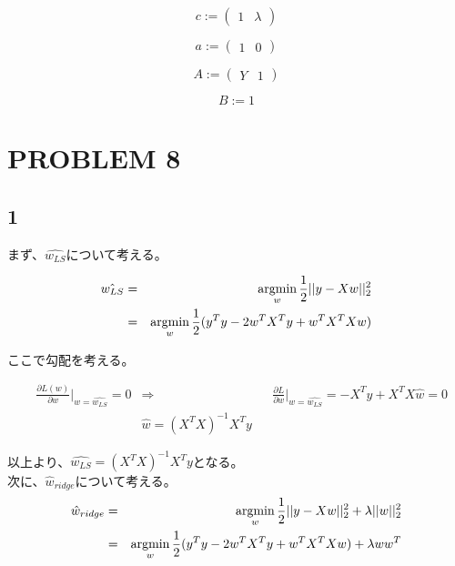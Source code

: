 \documentclass[a4j,11pt]{jarticle}
\newcommand{\argmin}{\mathop{\rm argmin}\limits}
\begin{document}
\begin{equation*}
    c :=
    \begin{pmatrix}
        1 & \lambda
    \end{pmatrix}
\end{equation*}

\begin{equation*}
    a :=
    \begin{pmatrix}
        1 & 0
    \end{pmatrix}
\end{equation*}

\begin{equation*}
    A :=
    \begin{pmatrix}
        Y & 1
    \end{pmatrix}
\end{equation*}

\begin{equation*}
    B := 1
\end{equation*}

\newpage
\section*{PROBLEM 8}
\subsection*{1}
まず、$\hat{w_{LS}}$について考える。

\begin{eqnarray}
    \hat{w_{LS}} &=& \argmin_{w} \frac{1}{2}||y-Xw||^2_2\\
    &=& \argmin_{w} \frac{1}{2}(y^Ty-2w^TX^Ty + w^TX^TXw)
\end{eqnarray}

ここで勾配を考える。

\begin{equation}
    \begin{aligned}
        & \frac{\partial L(w)}{\partial w}|_{w=\hat{w_{LS}}} = 0
        &\Rightarrow
        &&\frac{\partial L}{\partial w}|_{w=\hat{w_{LS}}} = -X^Ty + X^TX\hat{w} = 0\\
        &&\hat{w} = (X^TX)^{-1}X^Ty
    \end{aligned}
\end{equation}

以上より、$\hat{w_{LS}} = (X^TX)^{-1}X^Ty$となる。\\

次に、$\hat{w}_{ridge}$について考える。
\begin{eqnarray}
    \hat{w}_{ridge} &=& \argmin_{w} \frac{1}{2}||y-Xw||^2_2 + \lambda ||w||^2_2\\
    &=& \argmin_{w} \frac{1}{2}(y^Ty-2w^TX^Ty + w^TX^TXw) + \lambda ww^T
\end{eqnarray}
\end{document}
